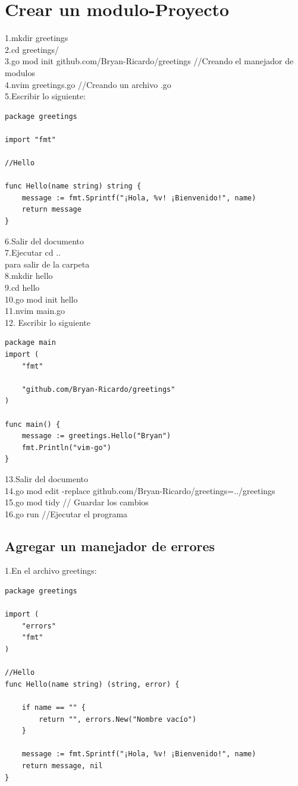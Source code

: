 \documentclass[10pt,a4paper]{article}
\begin{document}
\section{Crear un modulo-Proyecto}
1.mkdir greetings \\
2.cd greetings/  \\
3.go mod init github.com/Bryan-Ricardo/greetings //Creando el manejador de modulos \\
4.nvim greetings.go //Creando un archivo .go \\
5.Escribir lo siguiente: \\
\begin{verbatim}
package greetings

import "fmt"

//Hello

func Hello(name string) string {
	message := fmt.Sprintf("¡Hola, %v! ¡Bienvenido!", name)
	return message
}

\end{verbatim}

6.Salir del documento \\
7.Ejecutar cd .. \\para salir de la carpeta \\
8.mkdir hello \\ 
9.cd hello \\
10.go mod init hello \\
11.nvim main.go \\
12. Escribir lo siguiente 
\begin{verbatim}
package main
import (
	"fmt"

	"github.com/Bryan-Ricardo/greetings"
)

func main() {
	message := greetings.Hello("Bryan")
	fmt.Println("vim-go")
}

\end{verbatim}

13.Salir del documento \\ 
14.go mod edit -replace github.com/Bryan-Ricardo/greetings=../greetings\\
15.go mod tidy // Guardar los cambios \\
16.go run //Ejecutar el programa

\newpage

\subsection{Agregar un manejador de errores}
1.En el archivo greetings: 

\begin{verbatim}
package greetings

import (
	"errors"
	"fmt"
)

//Hello
func Hello(name string) (string, error) {

	if name == "" {
		return "", errors.New("Nombre vacío")
	}

	message := fmt.Sprintf("¡Hola, %v! ¡Bienvenido!", name)
	return message, nil
}
\end{verbatim}
\end{document}
